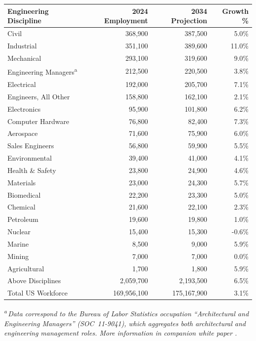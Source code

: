 \begin{table}[htbp]
  \centering
  \setlength{\tabcolsep}{14pt}
  \label{tab:litReview-employmentTrends}
  \begin{tabular}{@{}lrrr@{}}
    \toprule
    \bfseries Engineering Discipline & \bfseries 2024 Employment & \bfseries 2034 Projection & \bfseries Growth \% \\
    \midrule
    Civil & 368,900 & 387,500 & 5.0\% \\
    Industrial & 351,100 & 389,600 & 11.0\% \\
    Mechanical & 293,100 & 319,600 & 9.0\% \\
    Engineering Managers\textsuperscript{a} & 212,500 & 220,500 & 3.8\% \\
    Electrical & 192,000 & 205,700 & 7.1\% \\
    Engineers, All Other & 158,800 & 162,100 & 2.1\% \\
    Electronics & 95,900 & 101,800 & 6.2\% \\
    Computer Hardware & 76,800 & 82,400 & 7.3\% \\
    Aerospace & 71,600 & 75,900 & 6.0\% \\
    Sales Engineers & 56,800 & 59,900 & 5.5\% \\
    Environmental & 39,400 & 41,000 & 4.1\% \\
    Health \& Safety & 23,800 & 24,900 & 4.6\% \\
    Materials & 23,000 & 24,300 & 5.7\% \\
    Biomedical & 22,200 & 23,300 & 5.0\% \\
    Chemical & 21,600 & 22,100 & 2.3\% \\
    Petroleum & 19,600 & 19,800 & 1.0\% \\
    Nuclear & 15,400 & 15,300 & -0.6\% \\
    Marine & 8,500 & 9,000 & 5.9\% \\
    Mining & 7,000 & 7,000 & 0.0\% \\
    Agricultural & 1,700 & 1,800 & 5.9\% \\
    \midrule
    Above Disciplines & 2,059,700 & 2,193,500 & 6.5\% \\
    Total US Workforce & 169,956,100 & 175,167,900 & 3.1\% \\
    \bottomrule
  \end{tabular}
  \vspace{4pt}

  \parbox{0.98\linewidth}{
    \footnotesize\textit{\textsuperscript{a}\,Data correspond to the Bureau of Labor Statistics occupation ``Architectural and Engineering Managers'' (SOC~11-9041), which aggregates both architectural and engineering management roles. More information in companion white paper \cite{versteeg2026bls}.}
  }
\end{table}
